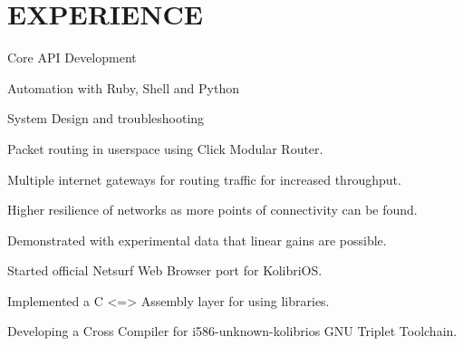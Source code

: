 \documentclass[letterpaper]{deedy-resume} %
\begin{document}
\hfill
%
%
\begin{minipage}[t]{0.66\textwidth} %
\section{EXPERIENCE}
\vspace{\topsep} %
\begin{tightitemize}
\item Core API Development \\
\item Automation with Ruby, Shell and Python \\
\item System Design and troubleshooting \\
\end{tightitemize}
\sectionspace %
\begin{tightitemize}
\item Packet routing in userspace using Click Modular Router.
\item Multiple internet gateways for routing traffic for increased throughput.
\item Higher resilience of networks as more points of connectivity can be found.
\item Demonstrated with experimental data that linear gains are possible.
\end{tightitemize}
\sectionspace %
\begin{tightitemize}
\item Started official Netsurf Web Browser port for KolibriOS.
\item Implemented a C <=> Assembly layer for using libraries.
\item Developing a Cross Compiler for i586-unknown-kolibrios GNU Triplet Toolchain.

\end{tightitemize}
\end{minipage}
\end{document}
